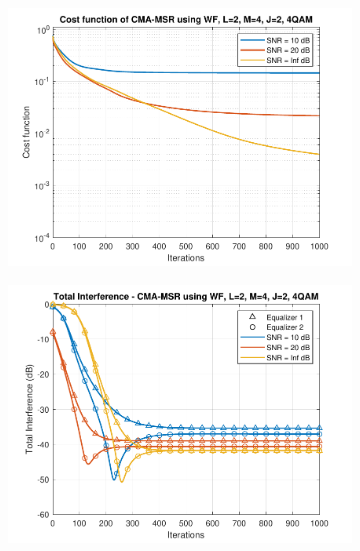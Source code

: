 \begin{figure}
	\centering
	\begin{subfigure}[b]{0.45\textwidth}
		\includegraphics[width=\linewidth]{./figs/BF_WF_MSR_cost_4QAM_L=2_M=4_J=2_K=1000.pdf}
		\label{fig:wf_msr_costqpsk}
	\end{subfigure}
	\begin{subfigure}[b]{0.45\textwidth}
		\includegraphics[width=\linewidth]{./figs/BF_WF_MSR_TI_4QAM_L=2_M=4_J=2_K=1000.pdf}
		\label{fig:wf_msr_ti_qpsk}
	\end{subfigure}\\
	\begin{subfigure}[b]{0.45\textwidth}

\end{subfigure}
\end{figure}
